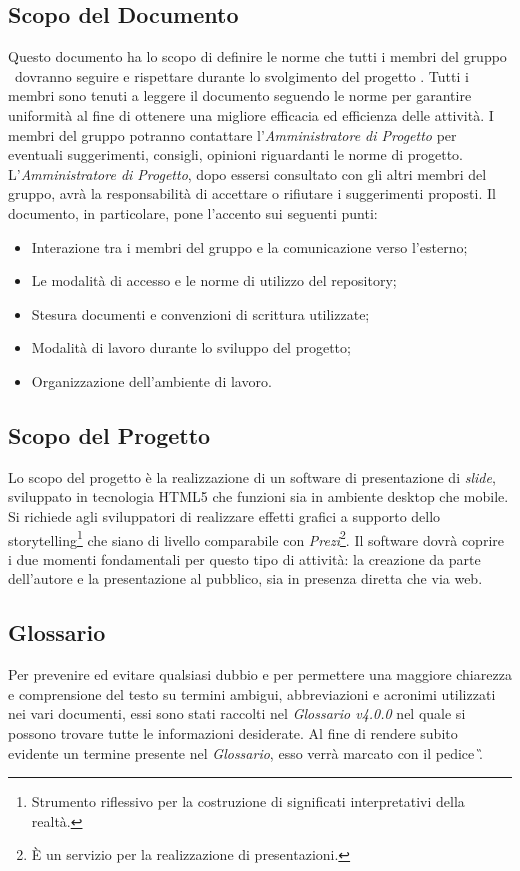 \subsection{Scopo del Documento}
Questo documento ha lo scopo di definire le norme che tutti i membri del gruppo \GRUPPO\ dovranno seguire e rispettare durante lo svolgimento del progetto \PROGETTO. Tutti i membri sono tenuti a leggere il documento seguendo le norme per garantire uniformità al fine di ottenere una migliore efficacia ed efficienza delle attività.
I membri del gruppo potranno contattare l'\textit{Amministratore di Progetto} per eventuali suggerimenti, consigli, opinioni riguardanti le norme di progetto. 
L'\textit{Amministratore di Progetto}, dopo essersi consultato con gli altri membri del gruppo, avrà la responsabilità di accettare o rifiutare i suggerimenti proposti. 
Il documento, in particolare, pone l'accento sui seguenti punti:

\begin{itemize}
	\item Interazione tra i membri del gruppo e la comunicazione verso l'esterno;
	\item Le modalità di accesso e le norme di utilizzo del \gls{repository};
	\item Stesura documenti e convenzioni di scrittura utilizzate;
	\item Modalità di lavoro durante lo sviluppo del progetto;
	\item Organizzazione dell'ambiente di lavoro.
\end{itemize}

\subsection{Scopo del Progetto}
Lo scopo del progetto è la realizzazione di un software di presentazione di \textit{\gls{slide}}, sviluppato in tecnologia \gls{HTML5} che funzioni sia in ambiente desktop che mobile.
Si richiede agli sviluppatori di realizzare effetti grafici a supporto dello storytelling\footnote{Strumento riflessivo per la costruzione di significati interpretativi della realtà.} che siano di livello comparabile con \textit{Prezi}\footnote{È un servizio per la realizzazione di presentazioni.}.
Il software dovrà coprire i due momenti fondamentali per questo tipo di attività: la creazione da parte dell'autore e la presentazione al pubblico, sia in presenza diretta che via web.

\subsection{Glossario}
Per prevenire ed evitare qualsiasi dubbio e per permettere una maggiore chiarezza e comprensione del testo su termini ambigui, abbreviazioni e acronimi utilizzati nei vari documenti, essi sono stati raccolti nel \textit{Glossario v4.0.0} nel quale si possono trovare tutte le informazioni desiderate.
Al fine di rendere subito evidente un termine presente nel \textit{Glossario}, esso verrà marcato con il pedice \G.

